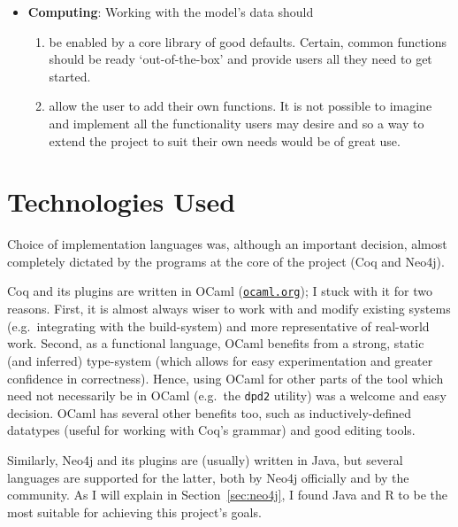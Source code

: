 \begin{itemize}
\begin{enumerate}[label=\textbf{I\arabic*},ref={I\arabic*}]
  \end{enumerate}

  \item \textbf {Computing}: Working with the model's data should
  \begin{enumerate}[label=\textbf{C\arabic*},ref={C\arabic*}]

    \item\label{req:c1} be enabled by a core library of good defaults. Certain,
      common functions should be ready `out-of-the-box' and provide users all
      they need to get started.

    \item\label{req:c2} allow the user to add their own functions. It is not
      possible to imagine and implement all the functionality users may desire
      and so a way to extend the project to suit their own needs would be of
      great use.

  \end{enumerate}


\end{itemize}

\section{Technologies Used}

Choice of implementation languages was, although an important decision, almost
completely dictated by the programs at the core of the project (Coq and Neo4j).

Coq and its plugins are written in OCaml
(\href{http://ocaml.org}{\texttt{ocaml.org}}); I stuck with it for two reasons.
First, it is almost always wiser to work with and modify existing systems (e.g.\
integrating with the build-system) and more representative of real-world work.
Second, as a functional language, OCaml benefits from a strong, static (and
inferred) type-system (which allows for easy experimentation and greater
confidence in correctness). Hence, using OCaml for other parts of the tool which
need not necessarily be in OCaml (e.g.\ the \texttt{dpd2} utility) was a welcome
and easy decision. OCaml has several other benefits too, such as
inductively-defined datatypes (useful for working with Coq's grammar) and good
editing tools.

Similarly, Neo4j and its plugins are (usually) written in Java, but several
languages are supported for the latter, both by Neo4j officially and by the
community. As I will explain in Section~\ref{sec:neo4j}, I found Java and
R to be the most suitable for achieving this project's goals.

